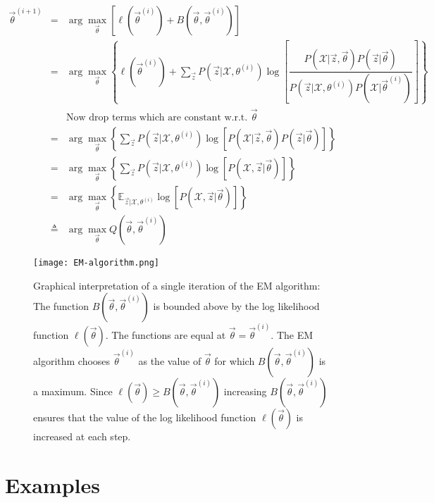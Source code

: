 \begin{eqnarray}
\vec{\theta}^{(i+1)} &=& \arg\max\limits_{\vec{\theta}}{\left[ \ell(\vec{\theta}^{(i)})+B(\vec{\theta},\vec{\theta}^{(i)})\right]} \nonumber \\
                &=& \arg\max\limits_{\vec{\theta}}{\left\{ \ell(\vec{\theta}^{(i)})+\sum\limits_{\vec{z}} P(\vec{z}|\mathcal{X},\theta^{(i)})\log\left[\dfrac{P(\mathcal{X}|\vec{z},\vec{\theta})P(\vec{z}|\vec{\theta})}{P(\vec{z}|\mathcal{X},\theta^{(i)})P(\mathcal{X}|\vec{\theta}^{(i)})}\right]\right\}} \nonumber \\
				&& \text{Now drop terms which are constant w.r.t. } \vec{\theta} \nonumber \\
				&=& \arg\max\limits_{\vec{\theta}}{\left\{\sum\limits_{\vec{z}} P(\vec{z}|\mathcal{X},\theta^{(i)})\log\left[P(\mathcal{X}|\vec{z},\vec{\theta})P(\vec{z}|\vec{\theta})\right]\right\}} \nonumber \\
				&=& \arg\max\limits_{\vec{\theta}}{\left\{\sum\limits_{\vec{z}} P(\vec{z}|\mathcal{X},\theta^{(i)})\log\left[P(\mathcal{X},\vec{z}|\vec{\theta})\right]\right\}} \nonumber \\
				&=& \arg\max\limits_{\vec{\theta}}{\left\{\mathbb{E}_{\vec{z}|\mathcal{X},\theta^{(i)}}\log\left[P(\mathcal{X},\vec{z}|\vec{\theta})\right]\right\}} \\
				&\triangleq& \arg\max\limits_{\vec{\theta}}{Q(\vec{\theta}, \vec{\theta}^{(i)})}
\end{eqnarray}

\begin{figure}[hbtp]
\centering
    \texttt{[image: EM-algorithm.png]}
\caption{Graphical interpretation of a single iteration of the EM algorithm: The function $B(\vec{\theta},\vec{\theta}^{(i)})$ is bounded above by the log likelihood function $\ell(\vec{\theta})$. The functions are equal at $\vec{\theta} = \vec{\theta}^{(i)}$. The EM algorithm chooses $\vec{\theta}^{(i)}$ as the value of $\vec{\theta}$ for which $B(\vec{\theta},\vec{\theta}^{(i)})$ is a maximum. Since $\ell(\vec{\theta}) \geq B(\vec{\theta},\vec{\theta}^{(i)})$ increasing $B(\vec{\theta},\vec{\theta}^{(i)})$ ensures that the value of the log likelihood function $\ell(\vec{\theta})$ is increased at each step.}
\label{fig:EM-algorithm} 
\end{figure}


\section{Examples}

